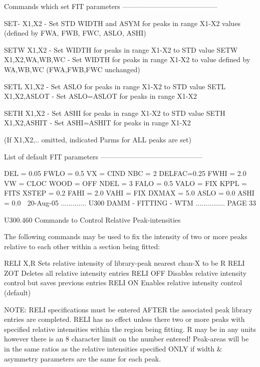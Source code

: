    Commands which set FIT parameters -----------------------------------------
 
   SET- X1,X2          - Set STD WIDTH and ASYM for peaks in range X1-X2
                         values (defined by FWA, FWB, FWC, ASLO, ASHI)
 
   SETW X1,X2          - Set WIDTH for peaks in range X1-X2 to STD value
   SETW X1,X2,WA,WB,WC - Set WIDTH for peaks in range X1-X2 to value
                         defined by WA,WB,WC (FWA,FWB,FWC unchanged)
 
   SETL X1,X2          - Set ASLO  for peaks in range X1-X2 to STD value
   SETL X1,X2,ASLOT    - Set ASLO=ASLOT for peaks in range X1-X2
 
   SETH X1,X2          - Set ASHI  for peaks in range X1-X2 to STD value
   SETH X1,X2,ASHIT    - Set ASHI=ASHIT for peaks in range X1-X2
 
   (If X1,X2,.. omitted, indicated Parms for ALL peaks are set)
 
   List of default FIT parameters --------------------------------------------
 
   DEL   = 0.05    FWLO = 0.5      VX   = CIND    NBC  = 2
   DELFAC=0.25     FWHI = 2.0      VW   = CLOC    WOOD = OFF
   NDEL  = 3       FALO = 0.5      VALO = FIX     KPPL = FITS
   XSTEP = 0.2     FAHI = 2.0      VAHI = FIX
   DXMAX = 5.0     ASLO = 0.0
                   ASHI = 0.0
    
   20-Aug-05 ............. U300  DAMM - FITTING - WTM ............... PAGE  33
 
   U300.460  Commands to Control Relative Peak-intensities
 
   The following commands may be used to fix the  intensity  of  two  or  more
   peaks relative to each other within a section being fitted:
 
   RELI  X,R   Sets relative intensity of library-peak nearest chan-X to be R
   RELI  ZOT   Deletes all relative intensity entries
   RELI  OFF   Disables relative intensity control but saves previous entries
   RELI  ON    Enables  relative intensity control (default)
 
   NOTE:  RELI  specifications  must  be  entered  AFTER  the  associated peak
   library entries are completed. RELI has no effect unless there two or  more
   peaks  with specified relative intensities within the region being fitting.
   R may be in any units however there is an 8 character limit on  the  number
   entered!  Peak-areas will be in the same ratios as the relative intensities
   specified ONLY if width & asymmetry parameters are the same for each peak.
 
